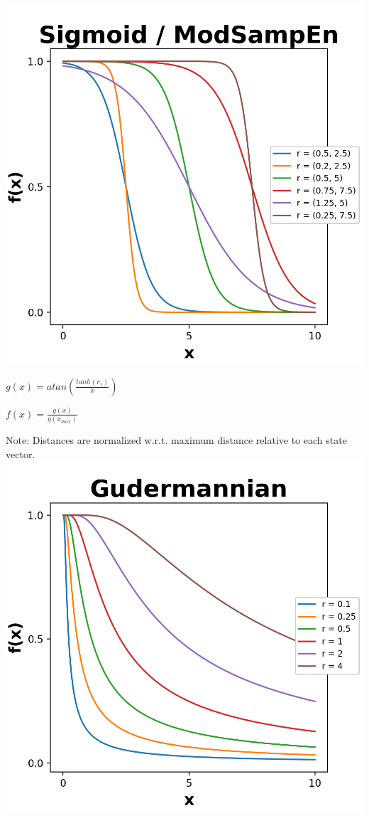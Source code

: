 \documentclass[12pt, a4paper, titlepage, openany]{book}
\begin{document}
\begin{description}[labelsep=1cm, labelwidth=2cm, nosep,style=multiline,leftmargin=3cm]
\begin{description}[labelsep=14em, labelwidth=10em, nosep,style=multiline,leftmargin=6cm]
		\includegraphics[scale=.5]{Fuzz1.png}
	\item[\texttt{"gudermannian"}] 	$g(x) = atan(\frac{tanh(r_1)}{x})$
	\item[]	$f(x) = \frac{g(x)}{g(x_{max})}$
	\item[]		Note: Distances are normalized w.r.t. maximum distance relative to each state vector.\\
		\includegraphics[scale=.5]{Fuzz3.png}

\end{description}
\end{description}
\end{document}
